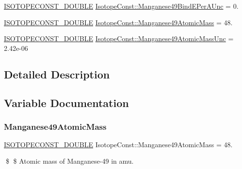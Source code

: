\begin{DoxyCompactItemize}
\mbox{\hyperlink{group___isotope_const-_macros_ga8f45a7272ce02c0b4c65c44636ed719a}{I\+S\+O\+T\+O\+P\+E\+C\+O\+N\+S\+T\+\_\+\+D\+O\+U\+B\+LE}} \mbox{\hyperlink{group___isotope_const-_manganese-_mn49_gad767d18f999abf2f1a376d4fd558a328}{Isotope\+Const\+::\+Manganese49\+Bind\+E\+Per\+A\+Unc}} = 0.
\item 
\mbox{\hyperlink{group___isotope_const-_macros_ga8f45a7272ce02c0b4c65c44636ed719a}{I\+S\+O\+T\+O\+P\+E\+C\+O\+N\+S\+T\+\_\+\+D\+O\+U\+B\+LE}} \mbox{\hyperlink{group___isotope_const-_manganese-_mn49_ga101e7070ed6ec695ee0545dfe95b9d2e}{Isotope\+Const\+::\+Manganese49\+Atomic\+Mass}} = 48.
\item 
\mbox{\hyperlink{group___isotope_const-_macros_ga8f45a7272ce02c0b4c65c44636ed719a}{I\+S\+O\+T\+O\+P\+E\+C\+O\+N\+S\+T\+\_\+\+D\+O\+U\+B\+LE}} \mbox{\hyperlink{group___isotope_const-_manganese-_mn49_ga74154ecd09c61ce4031e0a16ba6cd455}{Isotope\+Const\+::\+Manganese49\+Atomic\+Mass\+Unc}} = 2.\+42e-\/06
\end{DoxyCompactItemize}


\subsection{Detailed Description}


\subsection{Variable Documentation}
\mbox{\label{group___isotope_const-_manganese-_mn49_ga101e7070ed6ec695ee0545dfe95b9d2e}} 
\subsubsection{\texorpdfstring{Manganese49\+Atomic\+Mass}{Manganese49AtomicMass}}
{\footnotesize\ttfamily \mbox{\hyperlink{group___isotope_const-_macros_ga8f45a7272ce02c0b4c65c44636ed719a}{I\+S\+O\+T\+O\+P\+E\+C\+O\+N\+S\+T\+\_\+\+D\+O\+U\+B\+LE}} Isotope\+Const\+::\+Manganese49\+Atomic\+Mass = 48.}

\$ \$ Atomic mass of Manganese-\/49 in amu. \mbox{\label{group___isotope_const-_manganese-_mn49_ga74154ecd09c61ce4031e0a16ba6cd455}} 
